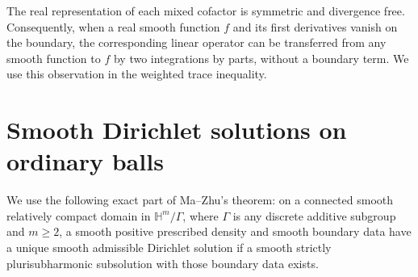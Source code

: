 \documentclass[11pt]{article}
\numberwithin{equation}{section}
\newcommand{\HH}{\mathbb H}
\begin{document}
The real representation of each mixed cofactor is symmetric and
divergence free. Consequently, when a real smooth function $f$ and
its first derivatives vanish on the boundary, the corresponding
linear operator can be transferred from any smooth function to $f$
by two integrations by parts, without a boundary term. We use this
observation in the weighted trace inequality.

\section{Smooth Dirichlet solutions on ordinary balls}\label{sec:dirichlet}

We use the following exact part of Ma--Zhu's theorem: on a connected
smooth relatively compact domain in $\HH^m/\Gamma$, where $\Gamma$
is any discrete additive subgroup and $m\ge2$, a smooth positive
prescribed density and smooth boundary data have a unique smooth
admissible Dirichlet solution if a smooth strictly plurisubharmonic
subsolution with those boundary data exists.
\end{document}
